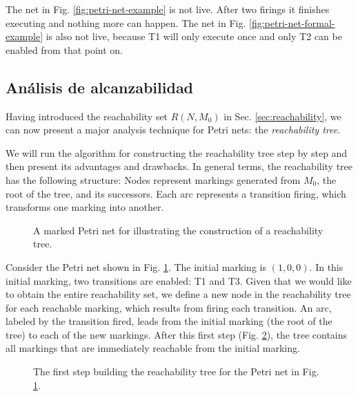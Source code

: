 The net in Fig. \ref{fig:petri-net-example} is not live.
After two firings it finishes executing and nothing more can happen.
The net in Fig. \ref{fig:petri-net-formal-example} is also not live, because
T1 will only execute once and only T2 can be enabled from that point on.

\subsection{Análisis de alcanzabilidad}

Having introduced the reachability set $R(N, M_0)$ in Sec. \ref{sec:reachability},
we can now present a major analysis technique for Petri nets: the \emph{reachability tree}.

We will run the algorithm for constructing the reachability tree step by step
and then present its advantages and drawbacks.
In general terms, the reachability tree has the following structure:
Nodes represent markings generated from $M_0$, the root of the tree, and its successors.
Each arc represents a transition firing, which transforms one marking into another.

\begin{figure}[!htb]
      \centering
      
      \caption{A marked Petri net for illustrating the construction of a reachability tree.}
      \label{fig:reachability-tree-example}
\end{figure}

Consider the Petri net shown in Fig. \ref{fig:reachability-tree-example}.
The initial marking is $(1, 0, 0)$.
In this initial marking, two transitions are enabled: T1 and T3.
Given that we would like to obtain the entire reachability set,
we define a new node in the reachability tree for each reachable marking,
which results from firing each transition.
An arc, labeled by the transition fired, leads from the initial marking
(the root of the tree) to each of the new markings.
After this first step (Fig. \ref{fig:reachability-tree-step-1}),
the tree contains all markings that are immediately reachable from the initial marking.

\begin{figure}[!htb]
      \centering
      
      \caption{The first step building the reachability tree
            for the Petri net in Fig. \ref{fig:reachability-tree-example}.}
      \label{fig:reachability-tree-step-1}
\end{figure}

